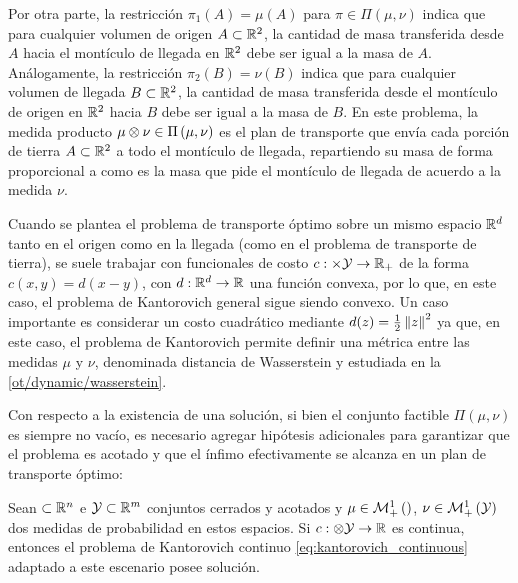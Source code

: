 
Por otra parte, la restricción $\pi_1(A)=\mu(A)$ para $\pi\in\Pi(\mu,\nu)$ indica que para cualquier volumen de origen $A\subset\mathbb{R}^2$, la cantidad de masa transferida desde $A$ hacia el montículo de llegada en $\mathbb{R}^2$ debe ser igual a la masa de $A$. Análogamente, la restricción $\pi_2(B)=\nu(B)$ indica que para cualquier volumen de llegada $B\subset\mathbb{R}^2$, la cantidad de masa transferida desde el montículo de origen en $\mathbb{R}^2$ hacia $B$ debe ser igual a la masa de $B$. En este problema, la medida producto $\mu\otimes\nu\in\Pi\left(\mu,\nu\right)$ es el plan de transporte que envía cada porción de tierra $A\subset\mathbb{R}^2$ a todo el montículo de llegada, repartiendo su masa de forma proporcional a como es la masa que pide el montículo de llegada de acuerdo a la medida $\nu$.

Cuando se plantea el problema de transporte óptimo sobre un mismo espacio $\mathbb{R}^d$ tanto en el origen como en la llegada (como en el problema de transporte de tierra), se suele trabajar con funcionales de costo $c:\times\mathcal{Y}\to\mathbb{R}_+$ de la forma $c(x,y)=d(x-y)$, con $d:\mathbb{R}^d\to\mathbb{R}$ una función convexa, por lo que, en este caso, el problema de Kantorovich general sigue siendo convexo. Un caso importante es considerar un costo cuadrático mediante $d(z)=\frac{1}{2}\left\lVert z \right\rVert^2$ ya que, en este caso, el problema de Kantorovich permite definir una métrica entre las medidas $\mu$ y $\nu$, denominada distancia de Wasserstein y estudiada en la \autoref{ot/dynamic/wasserstein}.

Con respecto a la existencia de una solución, si bien el conjunto factible $\Pi(\mu,\nu)$ es siempre no vacío, es necesario agregar hipótesis adicionales para garantizar que el problema es acotado y que el ínfimo efectivamente se alcanza en un plan de transporte óptimo:

\begin{prop}
	Sean $\subset\mathbb{R}^n$ e $\mathcal{Y}\subset\mathbb{R}^m$ conjuntos cerrados y acotados y $\mu\in\mathcal{M}_+^1\left(\right)$, $\nu\in\mathcal{M}_+^1\left(\mathcal{Y}\right)$ dos medidas de probabilidad en estos espacios. Si $c:\otimes\mathcal{Y}\to\mathbb{R}$ es continua, entonces el problema de Kantorovich continuo \eqref{eq:kantorovich_continuous} adaptado a este escenario posee solución.
\end{prop}

